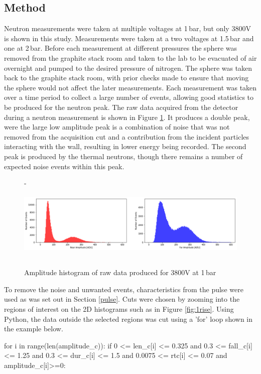 \documentclass[a4paper]{article}
\begin{document}
\subsection{Method}
Neutron measurements were taken at multiple voltages at 1\,bar, but only 3800V is shown in this study. Measurements were taken at a two voltages at 1.5\,bar and one at 2\,bar.
\newline Before each measurement at different pressures the sphere was removed from the graphite stack room and taken to the lab to be evacuated of air overnight and pumped to the desired pressure of nitrogen. The sphere was taken back to the graphite stack room, with prior checks made to ensure that moving the sphere would not affect the later measurements. Each measurement was taken over a time period to collect a large number of events, allowing good statistics to be produced for the neutron peak. 
\newline The raw data acquired from the detector during a neutron measurement is shown in Figure \ref{fig:ampb}. It produces a double peak, were the large low amplitude peak is a combination of noise that was not removed from the acquisition cut and a contribution from the incident particles interacting with the wall, resulting in lower energy being recorded. The second peak is produced by the thermal neutrons, though there remains a number of expected noise events within this peak. 
\begin{figure}[H]-
    \centering
    \includegraphics[height=3.7cm]{uk24n001_ampbefore.png}
    \caption{Amplitude histogram of raw data produced for 3800V at 1\,bar}
    \label{fig:ampb}
\end{figure}
\noindent To remove the noise and unwanted events, characteristics from the pulse were used as was set out in Section \ref{pulse}. Cuts were chosen by zooming into the regions of interest on the 2D histograms such as in Figure \ref{fig:1rise}. Using Python, the data outside the selected regions was cut using a 'for' loop shown in the example below.
\begin{python}
for i in range(len(amplitude_c)):
 if 0 <= len_c[i] <= 0.325 and 0.3 <= fall_c[i] <= 1.25 and 0.3 <= dur_c[i] <= 1.5 
 and 0.0075 <= rtc[i] <= 0.07 and amplitude_c[i]>=0:
\end{python}
\end{document}
